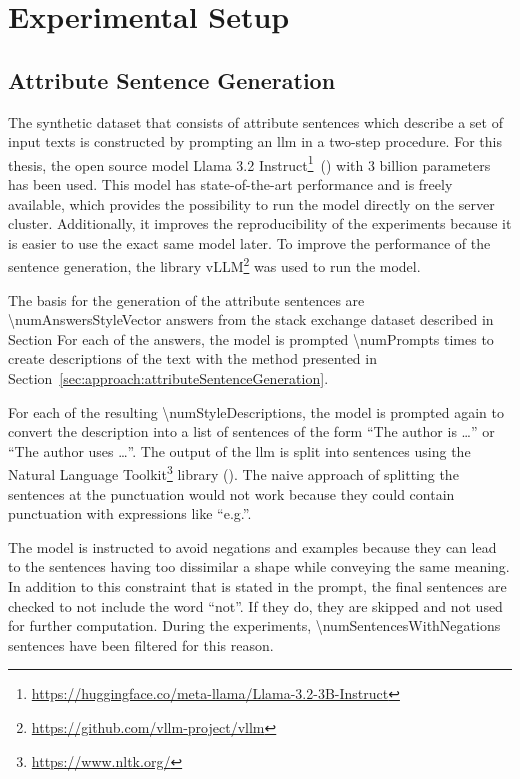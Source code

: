 
\section{Experimental Setup}
\label{sec:experiments:setup}


\subsection{Attribute Sentence Generation}
\label{sec:experiments:setup:sentenceGeneration}
The synthetic dataset that consists of attribute sentences which describe a set of input texts is constructed by prompting an \acs{llm} in a two-step procedure. For this thesis, the open source model Llama 3.2 Instruct\footnote{\url{https://huggingface.co/meta-llama/Llama-3.2-3B-Instruct}}~(\cite{dubeyLlama3Herd2024}) with \num{3} billion parameters has been used. This model has state-of-the-art performance and is freely available, which provides the possibility to run the model directly on the server cluster. Additionally, it improves the reproducibility of the experiments because it is easier to use the exact same model later.
To improve the performance of the sentence generation, the library vLLM\footnote{\url{https://github.com/vllm-project/vllm}} was used to run the model.

The basis for the generation of the attribute sentences are \num{\numAnswersStyleVector} answers from the stack exchange dataset described in Section %
For each of the answers, the model is prompted \num{\numPrompts} times to create descriptions of the text with the method presented in Section~\ref{sec:approach:attributeSentenceGeneration}.

For each of the resulting \num{\numStyleDescriptions}, the model is prompted again to convert the description into a list of sentences of the form \enquote{The author is \ldots} or \enquote{The author uses \ldots}. The output of the \ac{llm} is split into sentences using the Natural Language Toolkit\footnote{\url{https://www.nltk.org/}} library (\cite{birdNaturalLanguageProcessing2009}). The naive approach of splitting the sentences at the punctuation would not work because they could contain punctuation with expressions like \enquote{e.g.}.

The model is instructed to avoid negations and examples because they can lead to the sentences having too dissimilar a shape while conveying the same meaning. In addition to this constraint that is stated in the prompt, the final sentences are checked to not include the word \enquote{not}. If they do, they are skipped and not used for further computation. During the experiments, \num{\numSentencesWithNegations} sentences have been filtered for this reason.

